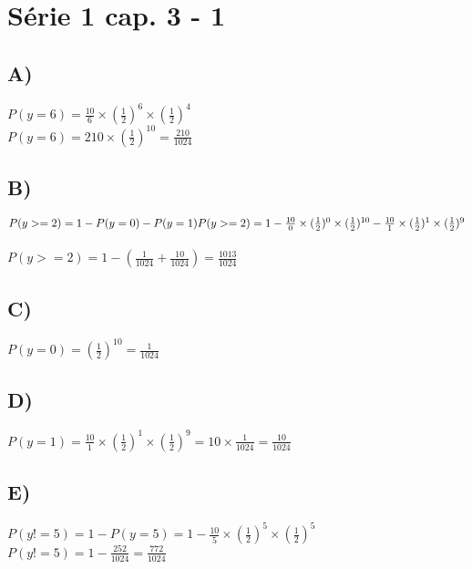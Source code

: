 \section*{Série 1 cap. 3 - 1}
    
    \subsection*{A)}
    $P(y=6) = \frac{10}{6}\times(\frac{1}{2})^6\times(\frac{1}{2})^4$\\
    $P(y=6) = 210\times(\frac{1}{2})^{10} = \frac{210}{1024}$
    
    \subsection*{B)}
    $P(y >= 2) = 1 - P(y = 0) - P(y = 1)\\ \\
    P(y >= 2) = 1 - \frac{10}{0}\times(\frac{1}{2})^0\times(\frac{1}{2})^{10} - \frac{10}{1}\times(\frac{1}{2})^1\times(\frac{1}{2})^9$\\ \\
    $P(y >= 2) = 1 - (\frac{1}{1024} + \frac{10}{1024}) = \frac{1013}{1024}$
    
    
    \subsection*{C)}
    $P(y=0) = (\frac{1}{2})^{10} = \frac{1}{1024}$
    
    \subsection*{D)}
    $P(y=1) = \frac{10}{1}\times(\frac{1}{2})^1\times(\frac{1}{2})^9 = 10 \times \frac{1}{1024} = \frac{10}{1024}$
    
    \subsection*{E)}
    $P(y != 5) = 1 - P(y = 5) = 1 - \frac{10}{5}\times(\frac{1}{2})^5\times(\frac{1}{2})^5$\\
    $P(y != 5) = 1 - \frac{252}{1024} = \frac{772}{1024}$
    

